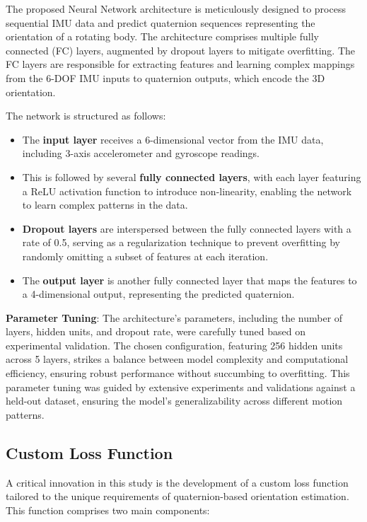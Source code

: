 \documentclass[conference]{IEEEtran}
\begin{document}
The proposed Neural Network architecture is meticulously designed to process sequential IMU data and predict quaternion sequences representing the orientation of a rotating body. The architecture comprises multiple fully connected (FC) layers, augmented by dropout layers to mitigate overfitting. The FC layers are responsible for extracting features and learning complex mappings from the 6-DOF IMU inputs to quaternion outputs, which encode the 3D orientation.

The network is structured as follows:
\begin{itemize}
\item The \textbf{input layer} receives a 6-dimensional vector from the IMU data, including 3-axis accelerometer and gyroscope readings.
\item This is followed by several \textbf{fully connected layers}, with each layer featuring a ReLU activation function to introduce non-linearity, enabling the network to learn complex patterns in the data.
\item \textbf{Dropout layers} are interspersed between the fully connected layers with a rate of 0.5, serving as a regularization technique to prevent overfitting by randomly omitting a subset of features at each iteration.
\item The \textbf{output layer} is another fully connected layer that maps the features to a 4-dimensional output, representing the predicted quaternion.
\end{itemize}

\textbf{Parameter Tuning}: The architecture's parameters, including the number of layers, hidden units, and dropout rate, were carefully tuned based on experimental validation. The chosen configuration, featuring 256 hidden units across 5 layers, strikes a balance between model complexity and computational efficiency, ensuring robust performance without succumbing to overfitting. This parameter tuning was guided by extensive experiments and validations against a held-out dataset, ensuring the model's generalizability across different motion patterns.

\subsection{Custom Loss Function}

A critical innovation in this study is the development of a custom loss function tailored to the unique requirements of quaternion-based orientation estimation. This function comprises two main components:
\end{document}
